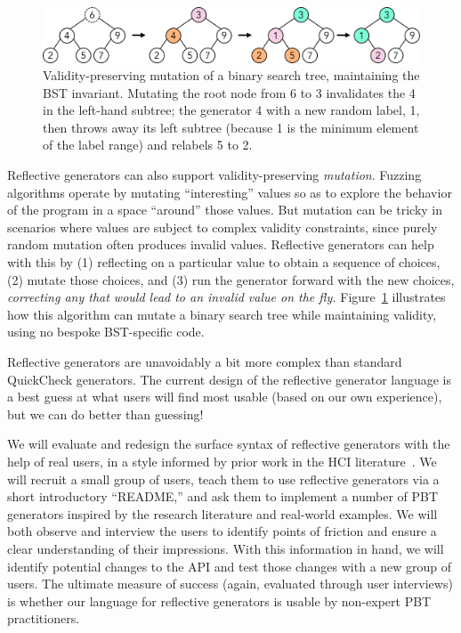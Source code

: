 \begin{figure}
  \centering
  \includegraphics[width=.65\textwidth]{assets/mutate-diagram.pdf}
  \caption{Validity-preserving mutation of a binary search tree, maintaining the
  BST invariant. Mutating the root node from 6 to 3 invalidates the
  4 in the left-hand subtree; the generator 4 with a new random label,
1, then throws away its left subtree (because 1 is the
minimum element of the label range) and relabels 5 to 2.}\label{fig:mutation}
\end{figure}

Reflective generators can also support
validity-preserving {\em mutation}.
Fuzzing algorithms operate by
mutating ``interesting'' values
so as to explore
the behavior of the program in a space ``around'' those
values. But mutation can be
tricky in scenarios where values are subject to complex validity
constraints, since purely random mutation often produces invalid
values. Reflective
generators can help with this by (1) reflecting on
a particular
value to obtain a sequence of choices, (2) mutate those choices, and (3) run the generator forward with the new
choices, {\em correcting any that
would lead to an invalid value on the fly.} Figure~\ref{fig:mutation}
illustrates how this
algorithm can mutate a binary search tree while maintaining validity,
using no bespoke BST-specific code.


Reflective generators are unavoidably a bit
more complex than standard QuickCheck generators. The current design of the
reflective generator language is a best guess at what users will find most
usable (based on our own experience), but we can do better than guessing!

We will evaluate and redesign the surface syntax of reflective generators with
the help of real users, in a style informed by prior work in the HCI
literature~\cite{ref:ko2015practical}.  We will recruit a small group of users, teach
them to use reflective generators via a short introductory ``README,'' and ask
them to implement a number of PBT generators inspired by the research
literature and real-world examples. We will both observe and interview
the users to identify points of friction and ensure a clear understanding of their
impressions. With this information in hand, we will identify potential changes
to the API and test those changes with a new group of users.  The
ultimate measure of success (again, evaluated through user interviews)
is whether our language for reflective generators is usable by non-expert PBT
practitioners.


